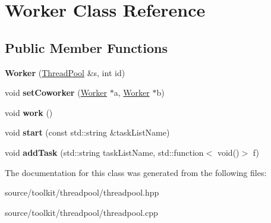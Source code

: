 \hypertarget{classWorker}{}\section{Worker Class Reference}
\label{classWorker}
\subsection*{Public Member Functions}
\begin{DoxyCompactItemize}
\item 
\mbox{\label{classWorker_a338cfdd6e6aa49e0e32272408418f24a}} 
{\bfseries Worker} (\mbox{\hyperlink{classThreadPool}{Thread\+Pool}} \&s, int id)
\item 
\mbox{\label{classWorker_aab8b9f8ab0fe23900d54f756279fe90e}} 
void {\bfseries set\+Coworker} (\mbox{\hyperlink{classWorker}{Worker}} $\ast$a, \mbox{\hyperlink{classWorker}{Worker}} $\ast$b)
\item 
\mbox{\label{classWorker_a296bc6b6cea5648d891561a01d2c3f98}} 
void {\bfseries work} ()
\item 
\mbox{\label{classWorker_ac119165540b853a85d8d828985961a3e}} 
void {\bfseries start} (const std\+::string \&task\+List\+Name)
\item 
\mbox{\label{classWorker_ad6091ae51d2fcd71697dce632ef5bf94}} 
void {\bfseries add\+Task} (std\+::string task\+List\+Name, std\+::function$<$ void()$>$ f)
\end{DoxyCompactItemize}


The documentation for this class was generated from the following files\+:\begin{DoxyCompactItemize}
\item 
source/toolkit/threadpool/threadpool.\+hpp\item 
source/toolkit/threadpool/threadpool.\+cpp\end{DoxyCompactItemize}

